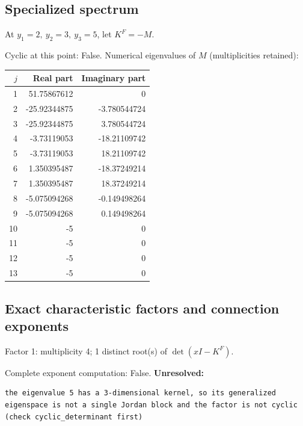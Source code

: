 \documentclass[10pt,a4paper]{article}
\newcommand{\fitmath}[1]{\sbox{\mathbox}{$\displaystyle #1$}\ifdim\wd\mathbox>\linewidth\resizebox{\linewidth}{!}{\usebox{\mathbox}}\else\usebox{\mathbox}\fi}
\begin{document}
\subsection*{Specialized spectrum}
At $y_1=2,\ y_2=3,\ y_3=5$, let $K^F=-M$.
\begin{center}\fitmath{\Delta=0}\end{center}
Cyclic at this point: False.
Numerical eigenvalues of $M$ (multiplicities retained):
\begin{center}\small\begin{tabular}{rrr}\toprule $j$ & Real part & Imaginary part\\\midrule
1 & 51.75867612 & 0\\
2 & -25.92344875 & -3.780544724\\
3 & -25.92344875 & 3.780544724\\
4 & -3.73119053 & -18.21109742\\
5 & -3.73119053 & 18.21109742\\
6 & 1.350395487 & -18.37249214\\
7 & 1.350395487 & 18.37249214\\
8 & -5.075094268 & -0.149498264\\
9 & -5.075094268 & 0.149498264\\
10 & -5 & 0\\
11 & -5 & 0\\
12 & -5 & 0\\
13 & -5 & 0\\
\bottomrule\end{tabular}\end{center}
\subsection*{Exact characteristic factors and connection exponents}
Factor 1: multiplicity 4; 1 distinct root(s) of $\det(xI-K^F)$.
\begin{center}\fitmath{\begin{aligned}p_{1}(x)&=x - 5\end{aligned}}\end{center}
Complete exponent computation: False.
\textbf{Unresolved:}

\begin{lstlisting}
the eigenvalue 5 has a 3-dimensional kernel, so its generalized eigenspace is not a single Jordan block and the factor is not cyclic (check cyclic_determinant first)
\end{lstlisting}
\end{document}
